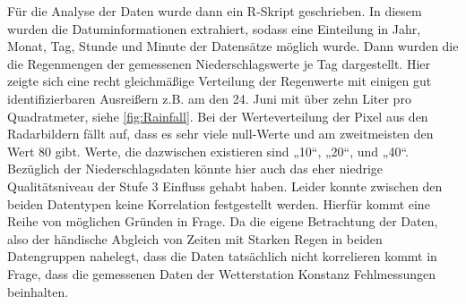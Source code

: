 Für die Analyse der Daten wurde dann ein R-Skript geschrieben. In diesem wurden die Datuminformationen extrahiert, sodass eine Einteilung in Jahr, Monat, Tag, Stunde und Minute der Datensätze möglich wurde. Dann wurden die die Regenmengen der gemessenen Niederschlagswerte je Tag dargestellt. Hier zeigte sich eine recht gleichmäßige Verteilung der Regenwerte mit einigen gut identifizierbaren Ausreißern z.B. am den 24. Juni mit über zehn Liter pro Quadratmeter, siehe \ref{fig:Rainfall}. Bei der Werteverteilung der Pixel aus den Radarbildern fällt auf, dass es sehr viele null-Werte und am zweitmeisten den Wert 80 gibt. Werte, die dazwischen existieren sind „10“, „20“, und „40“.  Bezüglich der Niederschlagsdaten könnte hier auch das eher niedrige Qualitätsniveau der Stufe 3 Einfluss gehabt haben.
Leider konnte zwischen den beiden Datentypen keine Korrelation festgestellt werden. Hierfür kommt eine Reihe von möglichen Gründen in Frage. Da die eigene Betrachtung der Daten, also der händische Abgleich von Zeiten mit Starken Regen in beiden Datengruppen nahelegt, dass die Daten tatsächlich nicht korrelieren kommt in Frage, dass die gemessenen Daten der Wetterstation Konstanz Fehlmessungen beinhalten. 
